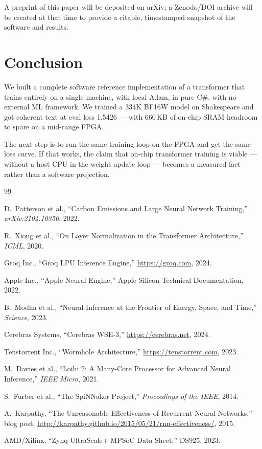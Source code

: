 \documentclass[11pt]{article}
\newcommand{\cpubfvaloss}{1.5426}
\begin{document}
A preprint of this paper will be deposited on arXiv; a Zenodo/DOI archive will be
created at that time to provide a citable, timestamped snapshot of the software and results.

\section{Conclusion}

We built a complete software reference implementation of a transformer that trains
entirely on a single machine, with local Adam, in pure C\#, with no external ML
framework. We trained a 334K BF16W model on Shakespeare and got coherent text at
eval loss \cpubfvaloss{} --- with 660\,KB of on-chip SRAM headroom to spare on a mid-range FPGA.

The next step is to run the same training loop on the FPGA and get the same loss curve.
If that works, the claim that on-chip transformer training is viable --- without a host
CPU in the weight update loop --- becomes a measured fact rather than a software projection.

\begin{thebibliography}{99}

D.~Patterson et al., ``Carbon Emissions and Large Neural Network Training,'' \emph{arXiv:2104.10350}, 2022.

R.~Xiong et al., ``On Layer Normalization in the Transformer Architecture,''
\emph{ICML}, 2020.

Groq Inc., ``Groq LPU Inference Engine,'' \url{https://groq.com}, 2024.

Apple Inc., ``Apple Neural Engine,'' Apple Silicon Technical Documentation, 2022.

B.~Modha et al., ``Neural Inference at the Frontier of Energy, Space, and Time,''
\emph{Science}, 2023.

Cerebras Systems, ``Cerebras WSE-3,'' \url{https://cerebras.net}, 2024.

Tenstorrent Inc., ``Wormhole Architecture,'' \url{https://tenstorrent.com}, 2023.

M.~Davies et al., ``Loihi 2: A Many-Core Processor for Advanced Neural Inference,''
\emph{IEEE Micro}, 2021.

S.~Furber et al., ``The SpiNNaker Project,'' \emph{Proceedings of the IEEE}, 2014.

A.~Karpathy, ``The Unreasonable Effectiveness of Recurrent Neural Networks,'' blog post,
\url{http://karpathy.github.io/2015/05/21/rnn-effectiveness/}, 2015.

AMD/Xilinx, ``Zynq UltraScale+ MPSoC Data Sheet,'' DS925, 2023.

\end{thebibliography}
\end{document}
